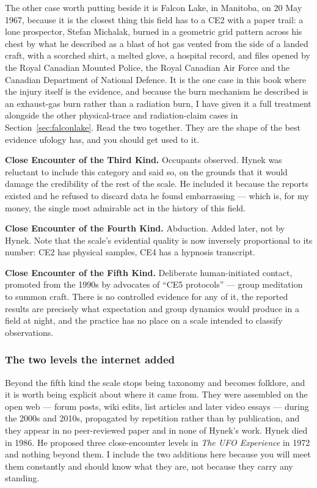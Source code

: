 The other case worth putting beside it is Falcon Lake, in Manitoba, on 20 May 1967, because it
is the closest thing this field has to a CE2 with a paper trail: a lone prospector, Stefan
Michalak, burned in a geometric grid pattern across his chest by what he described as a blast of
hot gas vented from the side of a landed craft, with a scorched shirt, a melted glove, a hospital
record, and files opened by the Royal Canadian Mounted Police, the Royal Canadian Air Force and
the Canadian Department of National Defence. It is the one case in this book where the injury
itself is the evidence, and because the burn mechanism he described is an exhaust-gas burn rather
than a radiation burn, I have given it a full treatment alongside the other physical-trace and
radiation-claim cases in Section~\ref{sec:falconlake}. Read the two together. They are the shape
of the best evidence ufology has, and you should get used to it.

\textbf{Close Encounter of the Third Kind.} Occupants observed. Hynek was reluctant to include
this category and said so, on the grounds that it would damage the credibility of the rest of
the scale. He included it because the reports existed and he refused to discard data he found
embarrassing --- which is, for my money, the single most admirable act in the history of this
field.

\textbf{Close Encounter of the Fourth Kind.} Abduction. Added later, not by Hynek. Note that
the scale's evidential quality is now inversely proportional to its number: CE2 has physical
samples, CE4 has a hypnosis transcript.

\textbf{Close Encounter of the Fifth Kind.} Deliberate human-initiated contact, promoted from
the 1990s by advocates of ``CE5 protocols'' --- group meditation to summon craft. There is no
controlled evidence for any of it, the reported results are precisely what expectation and
group dynamics would produce in a field at night, and the practice has no place on a scale
intended to classify observations.

\subsubsection*{The two levels the internet added}

Beyond the fifth kind the scale stops being taxonomy and becomes folklore, and it is worth being
explicit about where it came from.  They were assembled on the open web --- forum posts, wiki edits,
list articles and later video essays --- during the 2000s and 2010s, propagated by repetition
rather than by publication, and they appear in no peer-reviewed paper and in none of Hynek's
work. Hynek died in 1986. He proposed three close-encounter levels in \emph{The UFO Experience}
in 1972 and nothing beyond them. I include the two additions here because you will meet them
constantly and should know what they are, not because they carry any standing.

